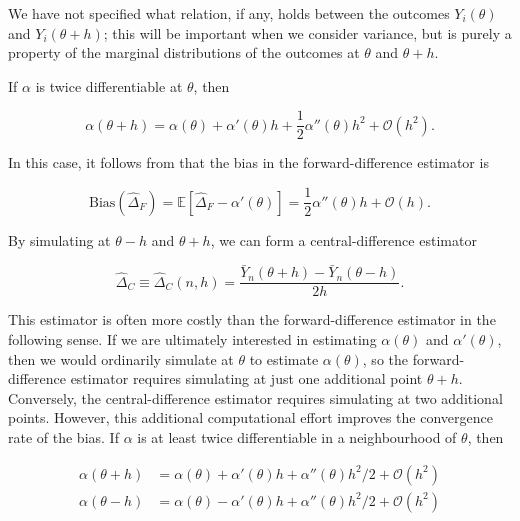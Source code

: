 We have not specified what relation, if any, holds between the outcomes \(Y_i(\theta)\) and \(Y_i(\theta+h)\); this will be important when we consider variance, but 
is purely a property of the marginal distributions of the outcomes at \(\theta\) and \(\theta+h\).

If \(\alpha\) is twice differentiable at \(\theta\), then

\begin{equation*}
	\alpha(\theta+h) = \alpha(\theta) + \alpha'(\theta)h + \frac{1}{2}\alpha''(\theta)h^2 + \mathcal{O}(h^2).
\end{equation*}

In this case, it follows from  that the bias in the forward-difference estimator is

\begin{equation}
	\text{Bias}(\hat{\Delta}_F) = \mathbb{E}[\hat{\Delta}_F - \alpha'(\theta)] = \frac{1}{2}\alpha''(\theta)h + \mathcal{O}(h).
	\label{eq:ForwardDiffBias}
\end{equation}

By simulating at \(\theta - h\) and \(\theta + h\), we can form a central-difference estimator

\begin{equation}
	\hat{\Delta}_C \equiv \hat{\Delta}_C (n,h) = \frac{\bar{Y}_n(\theta+h) - \bar{Y}_n(\theta-h)}{2h}.
	\label{eq:CentralDiffEstimator}
\end{equation}

This estimator is often more costly than the forward-difference estimator in the following sense. If we are ultimately interested in estimating \(\alpha(\theta)\) and \(\alpha'(\theta)\), then we would ordinarily simulate at \(\theta\) to estimate \(\alpha(\theta)\), so the forward-difference estimator requires simulating at just one additional point \(\theta + h\). Conversely, the central-difference estimator requires simulating at two additional points. However, this additional computational effort improves the convergence rate of the bias. If \(\alpha\) is at least twice differentiable in a neighbourhood of \(\theta\), then

\begin{align*}
	\alpha(\theta + h) & = \alpha(\theta) + \alpha'(\theta) h +\alpha''(\theta)h^2/2 + \mathcal{O}(h^2) \\
	\alpha(\theta - h) & = \alpha(\theta) - \alpha'(\theta) h +\alpha''(\theta)h^2/2 + \mathcal{O}(h^2)
\end{align*}


